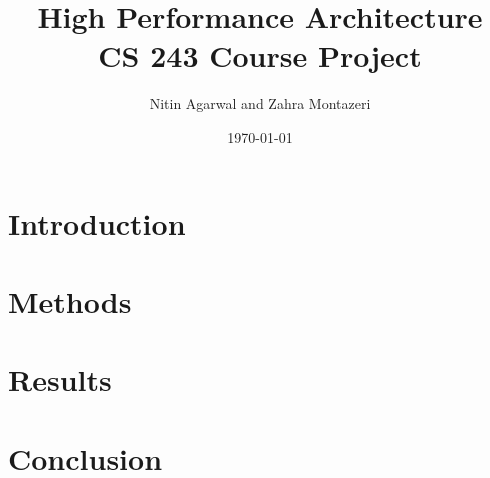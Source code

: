 \documentclass[11pt]{article}
\begin{document}
\tableofcontents
\title{High Performance Architecture \\
		CS 243 Course Project}
\author{Nitin Agarwal and Zahra Montazeri}
\date{\today}
\maketitle






\section{Introduction}
	

\section{Methods}

\section{Results}

\section{Conclusion}
\end{document}
